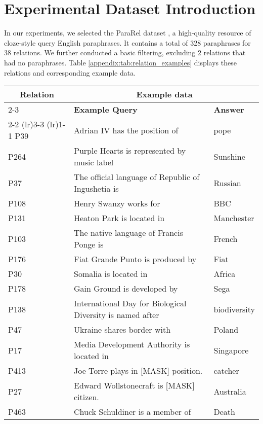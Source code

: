 

\section{Experimental Dataset Introduction}
\label{section:appendix-dataset}
In our experiments, we selected the ParaRel dataset \citet{elazar2021measuring-dataset}, a high-quality resource of cloze-style query English paraphrases. It contains a total of 328 paraphrases for 38 relations. We further conducted a basic filtering, excluding 2 relations that had no paraphrases. Table \ref{appendix:tab:relation_examples} displays these relations and corresponding example data.
\begin{table*}[t!]
\centering
\begin{tabular}{l l l} 
\toprule
\multicolumn{1}{c}{\multirow{3}{*}{{\textbf{Relation}}}} & \multicolumn{2}{c}{{\textbf{Example data}}} \\
\cmidrule(lr){2-3}
& {\textbf{Example Query}} & {\textbf{Answer}} \\ 
\cmidrule(lr){2-2} \cmidrule(lr){3-3}
\cmidrule(lr){1-1}
{P39}   & Adrian IV has the position of & pope \\
{P264}  & Purple Hearts is represented by music label & Sunshine \\
{P37}   & The official language of Republic of Ingushetia is & Russian \\
{P108}  & Henry Swanzy works for & BBC \\
{P131}  & Heaton Park is located in & Manchester \\
{P103}  & The native language of Francis Ponge is & French \\
{P176}  & Fiat Grande Punto is produced by & Fiat \\
{P30}   & Somalia is located in & Africa \\
{P178}  & Gain Ground is developed by & Sega \\
{P138}  & International Day for Biological Diversity is named after & biodiversity \\
{P47}   & Ukraine shares border with & Poland \\
{P17}   & Media Development Authority is located in & Singapore \\
{P413}  & Joe Torre plays in [MASK] position. & catcher \\
{P27}   & Edward Wollstonecraft is [MASK] citizen. & Australia \\
{P463}  & Chuck Schuldiner is a member of & Death \\

\end{tabular}
\end{table*}
